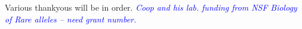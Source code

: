 \documentclass{pnastwo}
\newcommand{\jri}[1]{\textcolor{blue}{\emph{#1}} }
\begin{document}
\begin{article}
\begin{materials}


\end{materials}

\begin{acknowledgments}
Various thankyous will be in order. \jri{Coop and his lab. funding from NSF Biology of Rare alleles -- need grant number.}
\end{acknowledgments}





\end{article}
\end{document}
